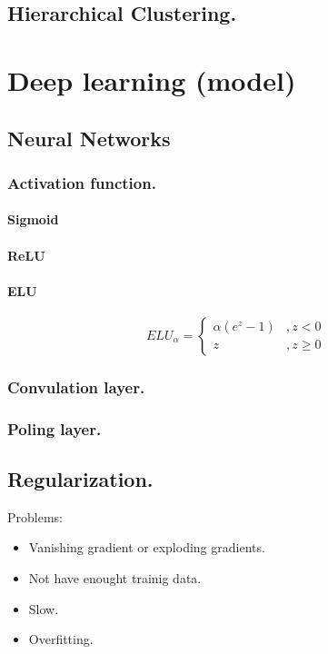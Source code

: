 \documentclass[12pt, a4paper]{book}
\begin{document}
\chapter{Hierarchical Clustering.}


\part{Deep learning (model)}

\chapter{Neural Networks}

\section{Activation function.}
\subsection*{Sigmoid}
\subsection*{ReLU}
\subsection*{ELU}

\begin{equation}
	ELU_{\alpha}=\begin{cases}
		\alpha (e^z-1)&, z<0\\
		z&, z\geq 0
	\end{cases} 
\end{equation}

\section{Convulation layer.}
\section{Poling layer.}


\chapter{Regularization.}
Problems:
\begin{itemize}
	\setlength\itemsep{0.1em}
	\item Vanishing gradient or exploding gradients.
	\item Not have enought trainig data.
	\item Slow.
	\item Overfitting.
\end{itemize}
\end{document}
